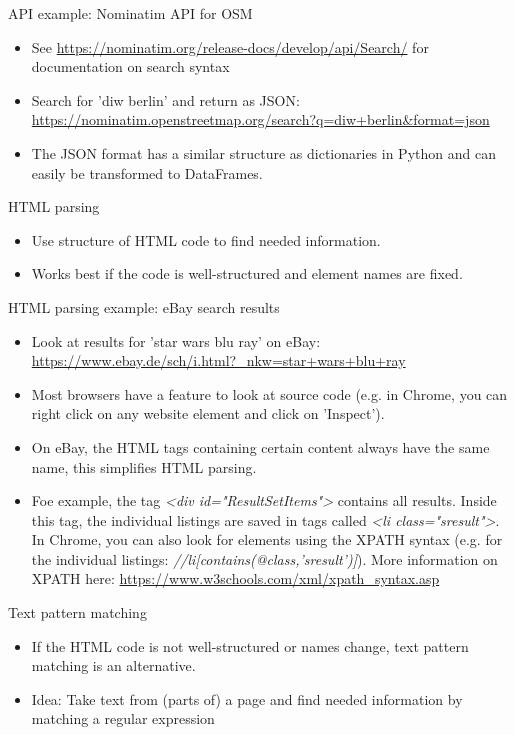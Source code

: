 \begin{frame}{API example: Nominatim API for OSM}
\begin{itemize}
	\item See \url{https://nominatim.org/release-docs/develop/api/Search/} for documentation on search syntax
	\item Search for 'diw berlin' and return as JSON: \url{https://nominatim.openstreetmap.org/search?q=diw+berlin&format=json}
	\item The JSON format has a similar structure as dictionaries in Python and can easily be transformed to DataFrames.
\end{itemize}

\end{frame}

\begin{frame}{HTML parsing}
\begin{itemize}
	\item Use structure of HTML code to find needed information.
	\item Works best if the code is well-structured and element names are fixed.
\end{itemize}
\end{frame}

\begin{frame}{HTML parsing example: eBay search results}
\begin{itemize}
	\item Look at results for 'star wars blu ray' on eBay: \url{https://www.ebay.de/sch/i.html?_nkw=star+wars+blu+ray}
	\item Most browsers have a feature to look at source code (e.g. in Chrome, you can right click on any website element and click on 'Inspect').
	\item On eBay, the HTML tags containing certain content always have the same name, this simplifies HTML parsing.
	\item Foe example, the tag \textit{<div id="ResultSetItems">} contains all results. Inside this tag, the individual listings are saved in tags called \textit{<li class="sresult">}. In Chrome, you can also look for elements using the XPATH syntax (e.g. for the individual listings: \textit{//li[contains(@class,'sresult')]}). More information on XPATH here: \url{https://www.w3schools.com/xml/xpath_syntax.asp}
\end{itemize}
\end{frame}

\begin{frame}{Text pattern matching}
\begin{itemize}
	\item If the HTML code is not well-structured or names change, text pattern matching is an alternative.
	\item Idea: Take text from (parts of) a page and find needed information by matching a regular expression
\end{itemize}
\end{frame}

